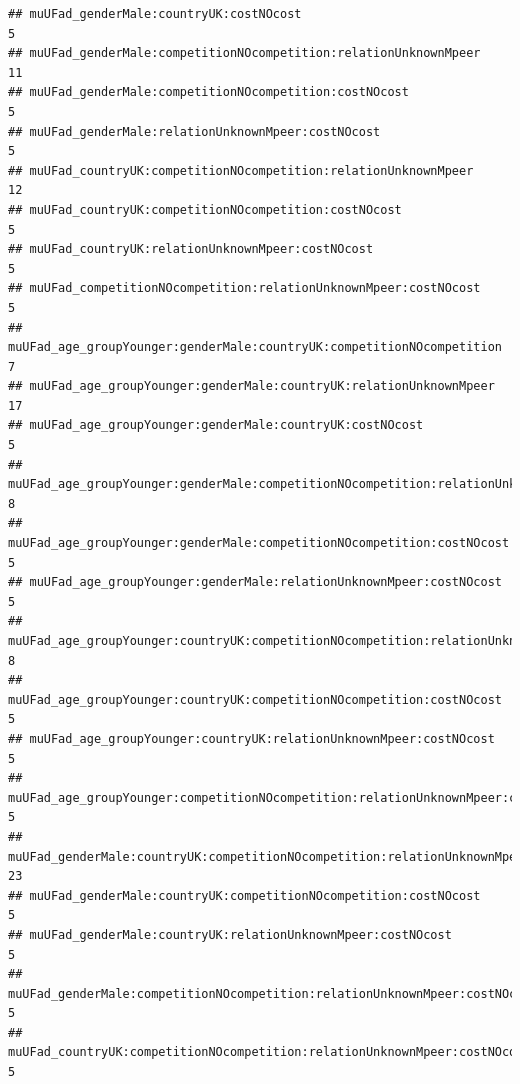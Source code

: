 \documentclass[
]{article}
\begin{document}
\begin{verbatim}
## muUFad_genderMale:countryUK:costNOcost                                                                        5
## muUFad_genderMale:competitionNOcompetition:relationUnknownMpeer                                              11
## muUFad_genderMale:competitionNOcompetition:costNOcost                                                         5
## muUFad_genderMale:relationUnknownMpeer:costNOcost                                                             5
## muUFad_countryUK:competitionNOcompetition:relationUnknownMpeer                                               12
## muUFad_countryUK:competitionNOcompetition:costNOcost                                                          5
## muUFad_countryUK:relationUnknownMpeer:costNOcost                                                              5
## muUFad_competitionNOcompetition:relationUnknownMpeer:costNOcost                                               5
## muUFad_age_groupYounger:genderMale:countryUK:competitionNOcompetition                                         7
## muUFad_age_groupYounger:genderMale:countryUK:relationUnknownMpeer                                            17
## muUFad_age_groupYounger:genderMale:countryUK:costNOcost                                                       5
## muUFad_age_groupYounger:genderMale:competitionNOcompetition:relationUnknownMpeer                              8
## muUFad_age_groupYounger:genderMale:competitionNOcompetition:costNOcost                                        5
## muUFad_age_groupYounger:genderMale:relationUnknownMpeer:costNOcost                                            5
## muUFad_age_groupYounger:countryUK:competitionNOcompetition:relationUnknownMpeer                               8
## muUFad_age_groupYounger:countryUK:competitionNOcompetition:costNOcost                                         5
## muUFad_age_groupYounger:countryUK:relationUnknownMpeer:costNOcost                                             5
## muUFad_age_groupYounger:competitionNOcompetition:relationUnknownMpeer:costNOcost                              5
## muUFad_genderMale:countryUK:competitionNOcompetition:relationUnknownMpeer                                    23
## muUFad_genderMale:countryUK:competitionNOcompetition:costNOcost                                               5
## muUFad_genderMale:countryUK:relationUnknownMpeer:costNOcost                                                   5
## muUFad_genderMale:competitionNOcompetition:relationUnknownMpeer:costNOcost                                    5
## muUFad_countryUK:competitionNOcompetition:relationUnknownMpeer:costNOcost                                     5

\end{verbatim}
\end{document}
